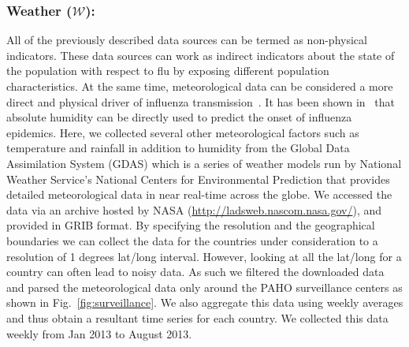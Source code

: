 \subsubsection{Weather ($\mathcal{W}$):}
All of the previously described data sources can
be termed as non-physical indicators. These data sources can work as indirect
indicators about the state of the population with respect to flu by exposing
different population characteristics. At the same time, meteorological data can
be considered a more direct and physical driver of influenza transmission~\cite{flu_humidity_physical}. It 
has been shown in~\cite{Shaman_orig_humidity_link, Shaman_humidity_USA, ref9}
that absolute humidity can be directly used to predict the onset of influenza
epidemics. Here, we collected several other meteorological factors such as
temperature and rainfall in addition to humidity from the Global Data
Assimilation System (GDAS) which is a series of weather models run by National
Weather Service's National Centers for Environmental Prediction that provides
detailed meteorological data in near real-time across the globe.  We accessed
the data via an archive hosted by NASA (\url{http://ladsweb.nascom.nasa.gov/}), 
and provided in GRIB format. By specifying the resolution and
the geographical boundaries we can collect the data for the countries under
consideration to a resolution of 1 degrees lat/long interval. However, looking
at all the lat/long for a country can often lead to noisy data. As such we
filtered the downloaded data and parsed the meteorological data only around the
PAHO surveillance centers as shown in Fig.~\ref{fig:surveillance}. We also
aggregate this data using weekly averages and thus obtain a resultant time series
for each country. We collected this data weekly from Jan 2013 to August 2013. 

